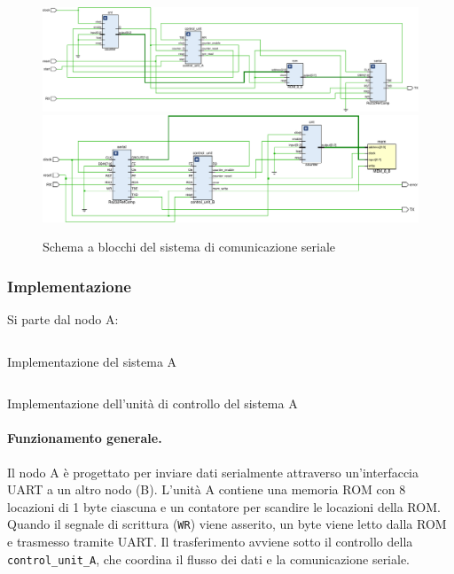 \begin{figure}[h]
    \centering
    \includegraphics[width=\linewidth]{img/10_UART-RS232_A.pdf}
    \includegraphics[width=\linewidth]{img/10_UART-RS232_B.pdf}
    \caption{Schema a blocchi del sistema di comunicazione seriale}
    \label{fig:10_UART-RS232}
\end{figure}

\subsubsection{Implementazione}
Si parte dal nodo A:

\begin{code}
    \inputminted{vhdl}{vhdl/uart_system_A.vhd}
    \caption{Implementazione del sistema A}
    \label{cod:uart_system_A}
\end{code}

\begin{code}
    \inputminted{vhdl}{vhdl/uart_control_unit_A.vhd}
    \caption{Implementazione dell'unità di controllo del sistema A}
    \label{cod:uart_control_unit_A}
\end{code}

\paragraph{Funzionamento generale.}
Il nodo A è progettato per inviare dati serialmente attraverso un'interfaccia UART a un altro nodo (B). L'unità A contiene una memoria ROM con 8 locazioni di 1 byte ciascuna e un contatore per scandire le locazioni della ROM. Quando il segnale di scrittura (\texttt{WR}) viene asserito, un byte viene letto dalla ROM e trasmesso tramite UART. Il trasferimento avviene sotto il controllo della \texttt{control\_unit\_A}, che coordina il flusso dei dati e la comunicazione seriale.

